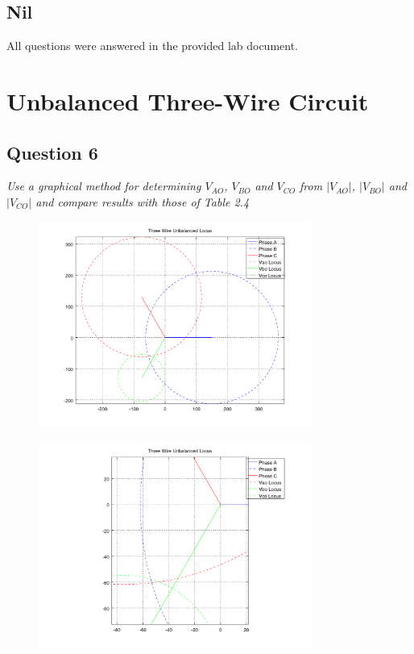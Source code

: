 \documentclass{article}
\begin{document}
  \subsection{Nil}
    All questions were answered in the provided lab document.
  \clearpage

\section{Unbalanced Three-Wire Circuit}
   \subsection{Question 6}
   \textit{Use a graphical method for determining $V_{AO}$, $V_{BO}$ and $V_{CO}$ from $|V_{AO}|$, $|V_{BO}|$ and $|V_{CO}|$ and compare results with those of Table 2.4} \\ 

   \begin{figure}[!h]
     \centering
     \includegraphics[width=0.8\textwidth]{Three_Phase_Unbalanced_Locus}
     \label{test}
   \end{figure}

   \begin{figure}[!h]
     \centering
     \includegraphics[width=0.8\textwidth]{von_determination}
     \label{test}
   \end{figure}
\end{document}
